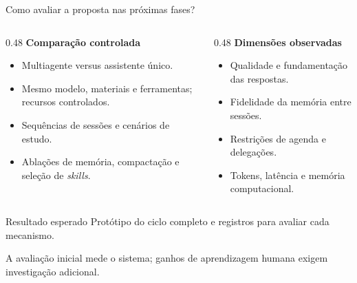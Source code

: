 \documentclass[aspectratio=169,11pt]{beamer}
\begin{document}
\begin{frame}{Como avaliar a proposta nas próximas fases?}
  \small
  \begin{columns}[T,onlytextwidth]
    \begin{column}{0.48\textwidth}
      \textbf{Comparação controlada}
      \begin{itemize}
        \item Multiagente versus assistente único.
        \item Mesmo modelo, materiais e ferramentas; recursos controlados.
        \item Sequências de sessões e cenários de estudo.
        \item Ablações de memória, compactação e seleção de \textit{skills}.
      \end{itemize}
    \end{column}
    \begin{column}{0.48\textwidth}
      \textbf{Dimensões observadas}
      \begin{itemize}
        \item Qualidade e fundamentação das respostas.
        \item Fidelidade da memória entre sessões.
        \item Restrições de agenda e delegações.
        \item Tokens, latência e memória computacional.
      \end{itemize}
    \end{column}
  \end{columns}
  \vspace{1mm}
  \begin{block}{Resultado esperado}
    Protótipo do ciclo completo e registros para avaliar cada mecanismo.
  \end{block}
  \footnotesize A avaliação inicial mede o sistema; ganhos de aprendizagem humana
  exigem investigação adicional.
\end{frame}
\end{document}
